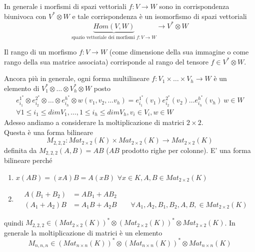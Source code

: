 \documentclass[../main.tex]{subfiles}
\begin{document}
In generale i morfismi di spazi vettoriali $f: V \rightarrow W$ sono in corrispondenza biunivoca con $V^* \otimes W$ e tale corrispondenza è un isomorfismo di spazi vettoriali
\begin{equation*}
    \underbrace{Hom(V, W)}_{\text{spazio vettoriale dei morfismi $f: V \rightarrow W$}} \rightarrow V^* \otimes W
\end{equation*}

Il rango di un morfismo $f: V \rightarrow W$ (come dimensione della sua immagine o come rango della sua matrice associata) corrisponde al rango del tensore $f \in V^* \otimes W$.

Ancora più in generale, ogni forma multilineare $f: V_1 \times \ldots \times V_h \rightarrow W$ è un elemento di $V_1^* \otimes \ldots \otimes V_h^* \otimes W$ posto
\begin{gather*}
    e_{i_1}^{1^*} \otimes e_{i_2}^{2^*} \otimes \ldots \otimes e_{i_h}^{h^*} \otimes w (v_1, v_2, \ldots v_h) = e_{i_1}^{1^*}(v_1)e_{i_2}^{2^*}(v_2) \ldots e_{i_h}^{h^*}(v_h) \: w \in W\\
    \forall 1 \leq i_1 \leq dim V_1, \ldots, 1 \leq i_h \leq dim V_h, v_i \in V_i, w \in W
\end{gather*}
Adesso andiamo a considerare la moltiplicazione di matrici $2 \times 2$.\\
Questa è una forma bilineare
\begin{equation*}
    M_{2,2,2} : Mat_{2 \times 2} (K) \times Mat_{2 \times 2} (K) \rightarrow Mat_{2 \times 2} (K)
\end{equation*}
definita da $M_{2,2,2}(A,B)= AB$ ($AB$ prodotto righe per colonne). E' una forma bilineare perché
\begin{enumerate}
    \item $x(AB) = (xA)B = A(xB)$ $\forall x \in K, A,B \in Mat_{2 \times 2} (K)$
    \item  \begin{align*}
              A(B_1 + B_2) & = AB_1 + AB_2                                                                   \\
              (A_1 + A_2)B & = A_1B + A_2B \qquad \forall A_1, A_2, B_1, B_2, A, B, \in Mat_{2 \times 2} (K)
          \end{align*}
\end{enumerate}
quindi $M_{2,2,2} \in (Mat_{2 \times 2} (K))^* \otimes (Mat_{2 \times 2} (K))^* \otimes Mat_{2 \times 2} (K)$. In generale la moltiplicazione di matrici è un elemento
\begin{equation*}
    M_{n,n,n} \in (Mat_{n \times n} (K))^* \otimes (Mat_{n \times n} (K))^* \otimes Mat_{n \times n} (K)
\end{equation*}
\end{document}
